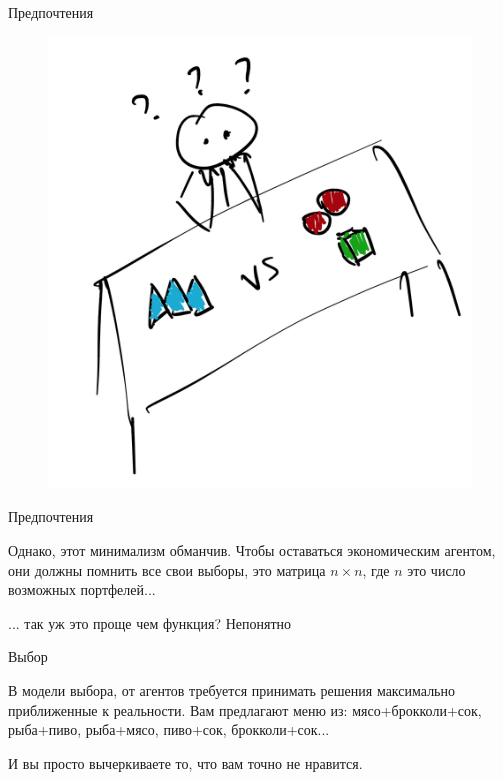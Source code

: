 \documentclass{beamer}
\begin{document}
\begin{frame}{Предпочтения}

\begin{figure}[hbt]
\centering
\includegraphics[width=.7 \textwidth]{pic4}
\end{figure}

\end{frame}

\begin{frame}{Предпочтения}

Однако, этот минимализм обманчив. Чтобы оставаться экономическим агентом, они должны помнить все свои выборы, это матрица $n \times n$, где $n$ это число возможных портфелей...

... так уж это проще чем функция? Непонятно

\end{frame}

\begin{frame}{Выбор}

В модели выбора, от агентов требуется принимать решения максимально приближенные к реальности. Вам предлагают меню из: мясо+брокколи+сок, рыба+пиво, рыба+мясо, пиво+сок, брокколи+сок...

И вы просто вычеркиваете то, что вам точно не нравится.

\end{frame}
\end{document}
